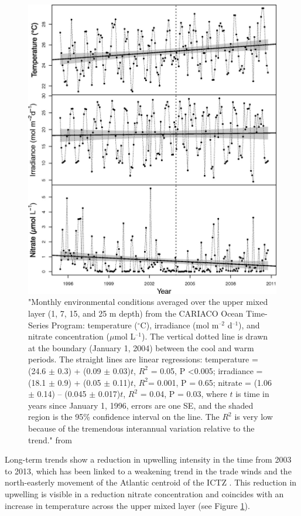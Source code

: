 \begin{figure}
\centering
\includegraphics[trim = 0mm 0mm 0mm 0mm, clip, width=0.7\linewidth]{./Chp1-Intro/IRWIN_F1.large.jpg}
\caption[Scheme]{\small {"Monthly environmental conditions averaged over the upper mixed layer (1, 7, 15, and 25 m depth) from the CARIACO Ocean Time-Series Program: temperature ($^\circ$C), irradiance (mol m$^{–2}$ d$^{–1}$), and nitrate concentration ($\mu$mol L$^{–1}$). The vertical dotted line is drawn at the boundary (January 1, 2004) between the cool and warm periods. The straight lines are linear regressions: temperature = (24.6 $\pm$ 0.3) + (0.09 $\pm$ 0.03)$t$, $R^2$ = 0.05, P \textless 0.005; irradiance = (18.1 $\pm$ 0.9) + (0.05 $\pm$ 0.11)$t$, $R^2$= 0.001, P = 0.65; nitrate = (1.06 $\pm$ 0.14) – (0.045 $\pm$ 0.017)$t$, $R^2$ = 0.04, P = 0.03, where $t$ is time in years since January 1, 1996, errors are one SE, and the shaded region is the 95\% confidence interval on the line. The $R^2$ is very low because of the tremendous interannual variation relative to the trend." from \cite{Irwin2015}}} %
\label{CARIACOTaylorTrends}
\end{figure}

Long-term trends show a reduction in upwelling intensity in the time from 2003 to 2013, which has been linked to a weakening trend in the trade winds and the north-easterly movement of the Atlantic centroid of the ICTZ 
\citep{Taylor2012}. This reduction in upwelling is visible in a reduction nitrate concentration and coincides with an increase in temperature across the upper mixed layer (see Figure \ref{CARIACOTaylorTrends}). 

